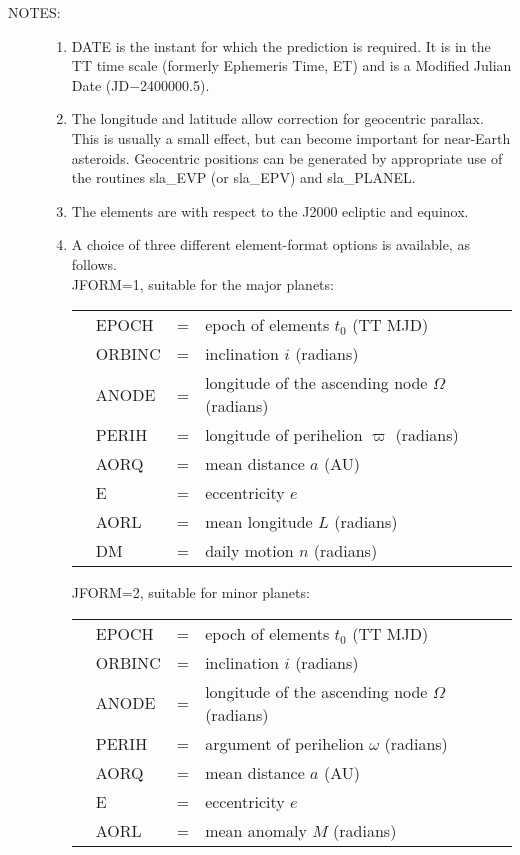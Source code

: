 \documentclass[11pt,twoside,nolof]{starlink}
\newcommand{\notes}[1]
 {
   \begin{description}
     \item[NOTES:]
         #1
   \end{description}
}
\begin{document}
\notes
{
 \begin{enumerate}
  \item DATE is the instant for which the prediction is
        required.  It is in the TT time scale (formerly
        Ephemeris Time, ET) and is a
        Modified Julian Date (JD$-$2400000.5).
  \item The longitude and latitude allow correction for geocentric
        parallax.  This is usually a small effect, but can become
        important for near-Earth asteroids.  Geocentric positions
        can be generated by appropriate use of the routines
        sla\_EVP (or sla\_EPV) and sla\_PLANEL.
  \item The elements are with respect to the J2000 ecliptic and equinox.
  \item A choice of three different element-format options is available, as
        follows. \\

        JFORM=1, suitable for the major planets:

        \begin{tabular}{llll}
        & EPOCH  & = & epoch of elements $t_0$ (TT MJD) \\
        & ORBINC & = & inclination $i$ (radians) \\
        & ANODE  & = & longitude of the ascending node $\Omega$ (radians) \\
        & PERIH  & = & longitude of perihelion $\varpi$ (radians) \\
        & AORQ   & = & mean distance $a$ (AU) \\
        & E      & = & eccentricity $e$ \\
        & AORL   & = & mean longitude $L$ (radians) \\
        & DM     & = & daily motion $n$ (radians)
        \end{tabular}

        JFORM=2, suitable for minor planets:

        \begin{tabular}{llll}
        & EPOCH  & = & epoch of elements $t_0$ (TT MJD) \\
        & ORBINC & = & inclination $i$ (radians) \\
        & ANODE  & = & longitude of the ascending node $\Omega$ (radians) \\
        & PERIH  & = & argument of perihelion $\omega$ (radians) \\
        & AORQ   & = & mean distance $a$ (AU) \\
        & E      & = & eccentricity $e$ \\
        & AORL   & = & mean anomaly $M$ (radians)
        \end{tabular}


\end{enumerate}}
\end{document}
